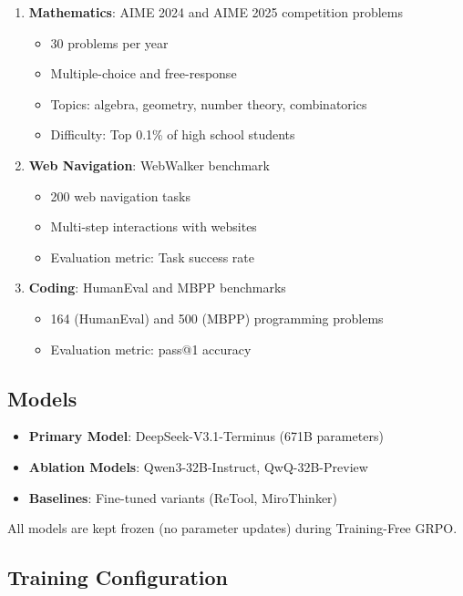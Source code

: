 \documentclass[11pt,a4paper]{article}
\begin{document}
\begin{enumerate}
    \item \textbf{Mathematics}: AIME 2024 and AIME 2025 competition problems
    \begin{itemize}
        \item 30 problems per year
        \item Multiple-choice and free-response
        \item Topics: algebra, geometry, number theory, combinatorics
        \item Difficulty: Top 0.1\% of high school students
    \end{itemize}

    \item \textbf{Web Navigation}: WebWalker benchmark
    \begin{itemize}
        \item 200 web navigation tasks
        \item Multi-step interactions with websites
        \item Evaluation metric: Task success rate
    \end{itemize}

    \item \textbf{Coding}: HumanEval and MBPP benchmarks
    \begin{itemize}
        \item 164 (HumanEval) and 500 (MBPP) programming problems
        \item Evaluation metric: pass@1 accuracy
    \end{itemize}
\end{enumerate}

\subsection{Models}

\begin{itemize}
    \item \textbf{Primary Model}: DeepSeek-V3.1-Terminus (671B parameters)
    \item \textbf{Ablation Models}: Qwen3-32B-Instruct, QwQ-32B-Preview
    \item \textbf{Baselines}: Fine-tuned variants (ReTool, MiroThinker)
\end{itemize}

All models are kept frozen (no parameter updates) during Training-Free GRPO.

\subsection{Training Configuration}
\end{document}
